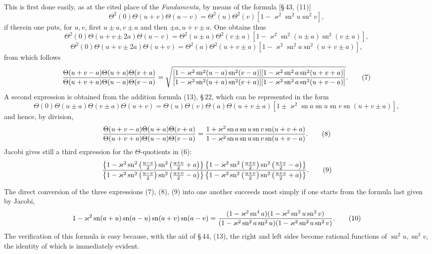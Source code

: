 \documentclass[11pt]{article}
\providecommand{\sn}{\operatorname{sn}}
\begin{document}
This is first done easily, as at the cited place of the \emph{Fundamenta}, by means of the formula [\S\,43, (11)]
\[
\Theta^2(0)\Theta(u+v)\Theta(u-v)=\Theta^2(u)\Theta^2(v)[1-\varkappa^2\sn^2u\sn^2v],
\]
if therein one puts, for $u,v$, first $u\pm a,v\pm a$ and then $\pm a,u+v\pm a$. One obtains thus
\[
\Theta^2(0)\Theta(u+v\pm2a)\Theta(u-v)
=\Theta^2(u\pm a)\Theta^2(v\pm a)[1-\varkappa^2\sn^2(u\pm a)\sn^2(v\pm a)],
\]
\[
\Theta^2(0)\Theta(u+v\pm2a)\Theta(u+v)
=\Theta^2(a)\Theta^2(u+v\pm a)[1-\varkappa^2\sn^2a\sn^2(u+v\pm a)],
\]
from which follows
\begin{equation}
{\Theta(u+v-a)\Theta(u+a)\Theta(v+a)
\over\Theta(u+v+a)\Theta(u-a)\Theta(v-a)}
=\sqrt{ {[1-\varkappa^2\sn^2(u-a)\sn^2(v-a)][1-\varkappa^2\sn^2a\sn^2(u+v+a)]
\over
[1-\varkappa^2\sn^2(u+a)\sn^2(v+a)][1-\varkappa^2\sn^2a\sn^2(u+v-a)]} }.
\tag{7}
\end{equation}
A second expression is obtained from the addition formula (13), \S\,22, which can be represented in the form
\[
\Theta(0)\Theta(u\pm a)\Theta(v\pm a)\Theta(u+v)
=\Theta(u)\Theta(v)\Theta(a)\Theta(u+v\pm a)
[1\pm\varkappa^2\sn a\sn u\sn v\sn(u+v\pm a)],
\]
and hence, by division,
\begin{equation}
{\Theta(u+v-a)\Theta(u+a)\Theta(v+a)
\over\Theta(u+v+a)\Theta(u-a)\Theta(v-a)}
={1+\varkappa^2\sn a\sn u\sn v\sn(u+v+a)
\over1-\varkappa^2\sn a\sn u\sn v\sn(u+v-a)}.
\tag{8}
\end{equation}
Jacobi gives still a third expression for the $\Theta$-quotients in (6):
\begin{equation}
{\left\{1-\varkappa^2\sn^2\left({u-v\over2}\right)\sn^2\left({u+v\over2}+a\right)\right\}
\left\{1-\varkappa^2\sn^2\left({u+v\over2}\right)\sn^2\left({u+v\over2}-a\right)\right\}
\over
\left\{1-\varkappa^2\sn^2\left({u-v\over2}\right)\sn^2\left({u+v\over2}-a\right)\right\}
\left\{1-\varkappa^2\sn^2\left({u+v\over2}\right)\sn^2\left({u+v\over2}+a\right)\right\}}.
\tag{9}
\end{equation}

The direct conversion of the three expressions (7), (8), (9) into one another succeeds most simply if one starts from the formula last given by Jacobi,
\begin{equation}
1-\varkappa^2\sn(a+u)\sn(a-u)\sn(a+v)\sn(a-v)
={(1-\varkappa^2\sn^4a)(1-\varkappa^2\sn^2u\sn^2v)
\over(1-\varkappa^2\sn^2a\sn^2u)(1-\varkappa^2\sn^2a\sn^2v)}.
\tag{10}
\end{equation}
The verification of this formula is easy because, with the aid of \S\,44, (13), the right and left sides become rational functions of $\sn^2u,\sn^2v$, the identity of which is immediately evident.
\end{document}
